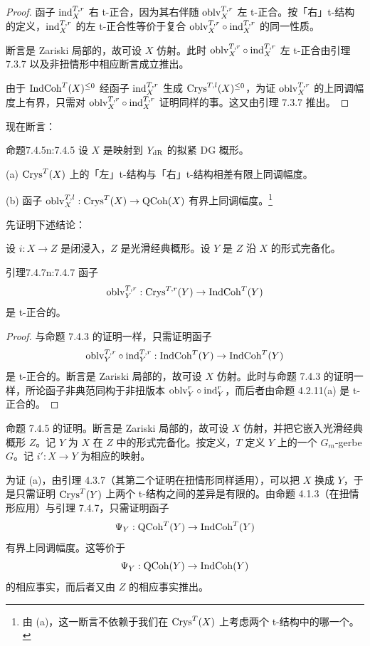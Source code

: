 \begin{proof}
函子 $\mathrm{ind}^{T,r}_X$ 右 t-正合，因为其右伴随 $\mathrm{oblv}^{T,r}_X$ 左 t-正合。按「右」t-结构的定义，$\mathrm{ind}^{T,r}_X$ 的左 t-正合性等价于复合 $\mathrm{oblv}^{T,r}_X\circ\mathrm{ind}^{T,r}_X$ 的同一性质。

断言是 Zariski 局部的，故可设 $X$ 仿射。此时 $\mathrm{oblv}^{T,r}_X\circ\mathrm{ind}^{T,r}_X$ 左 t-正合由引理 7.3.7 以及非扭情形中相应断言成立推出。

由于 $\mathrm{IndCoh}^T(X)^{\leq 0}$ 经函子 $\mathrm{ind}^{T,r}_X$ 生成 $\mathrm{Crys}^{T,l}(X)^{\leq 0}$，为证 $\mathrm{oblv}^{T,r}_X$ 的上同调幅度上有界，只需对 $\mathrm{oblv}^{T,r}_X\circ\mathrm{ind}^{T,r}_X$ 证明同样的事。这又由引理 7.3.7 推出。
\end{proof}

现在断言：

\begin{othm}{命题}{7.4.5}{n:7.4.5}
设 $X$ 是映射到 $Y_{\mathrm{dR}}$ 的拟紧 DG 概形。

(a) $\mathrm{Crys}^T(X)$ 上的「左」t-结构与「右」t-结构相差有限上同调幅度。

(b) 函子 $\mathrm{oblv}^{T,l}_X:\mathrm{Crys}^T(X)\to\mathrm{QCoh}(X)$ 有界上同调幅度。\footnote{由 (a)，这一断言不依赖于我们在 $\mathrm{Crys}^T(X)$ 上考虑两个 t-结构中的哪一个。}
\end{othm}

先证明下述结论：

设 $i:X\to Z$ 是闭浸入，$Z$ 是光滑经典概形。设 $Y$ 是 $Z$ 沿 $X$ 的形式完备化。

\begin{othm}{引理}{7.4.7}{n:7.4.7}
函子
\[
\mathrm{oblv}^{T,r}_Y:\mathrm{Crys}^{T,r}(Y)\to\mathrm{IndCoh}^T(Y)
\]
是 t-正合的。
\end{othm}

\begin{proof}
与命题 7.4.3 的证明一样，只需证明函子
\[
\mathrm{oblv}^{T,r}_Y\circ\mathrm{ind}^{T,r}_Y:\mathrm{IndCoh}^T(Y)\to\mathrm{IndCoh}^T(Y)
\]
是 t-正合的。断言是 Zariski 局部的，故可设 $X$ 仿射。此时与命题 7.4.3 的证明一样，所论函子非典范同构于非扭版本 $\mathrm{oblv}^r_Y\circ\mathrm{ind}^r_Y$，而后者由命题 4.2.11(a) 是 t-正合的。
\end{proof}

命题 7.4.5 的证明。断言是 Zariski 局部的，故可设 $X$ 仿射，并把它嵌入光滑经典概形 $Z$。记 $Y$ 为 $X$ 在 $Z$ 中的形式完备化。按定义，$T$ 定义 $Y$ 上的一个 $G_m$-gerbe $G$。记 $i':X\to Y$ 为相应的映射。

为证 (a)，由引理 4.3.7（其第二个证明在扭情形同样适用），可以把 $X$ 换成 $Y$，于是只需证明 $\mathrm{Crys}^T(Y)$ 上两个 t-结构之间的差异是有限的。由命题 4.1.3（在扭情形应用）与引理 7.4.7，只需证明函子
\[
\Psi_Y:\mathrm{QCoh}^T(Y)\to\mathrm{IndCoh}^T(Y)
\]
有界上同调幅度。这等价于
\[
\Psi_Y:\mathrm{QCoh}(Y)\to\mathrm{IndCoh}(Y)
\]
的相应事实，而后者又由 $Z$ 的相应事实推出。

